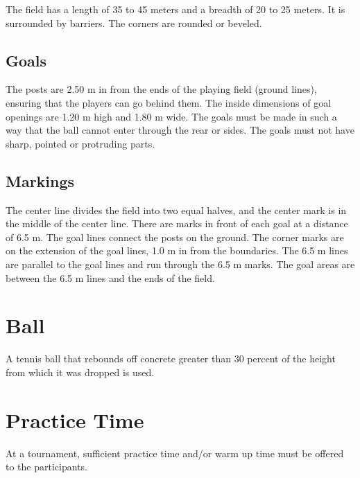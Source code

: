 

The field has a length of 35 to 45 meters and a breadth of 20 to 25 meters.
It is surrounded by barriers.
The corners are rounded or beveled.

\subsection{Goals}
The posts are 2.50 m in from the ends of the playing field (ground lines), ensuring that the players can go behind them.
The inside dimensions of goal openings are 1.20 m high and 1.80 m wide.
The goals must be made in such a way that the ball cannot enter through the rear or sides.
The goals must not have sharp, pointed or protruding parts.

\subsection{Markings}
The center line divides the field into two equal halves, and the center mark is in the middle of the center line.
There are marks in front of each goal at a distance of 6.5 m.
The goal lines connect the posts on the ground.
The corner marks are on the extension of the goal lines, 1.0 m in from the boundaries.
The 6.5 m lines are parallel to the goal lines and run through the 6.5 m marks.
The goal areas are between the 6.5 m lines and the ends of the field.

\section{Ball}
A tennis ball that rebounds off concrete greater than 30 percent of the height from which it was dropped is used.

\section{Practice Time}
At a tournament, sufficient practice time and/or warm up time must be offered to the participants.
